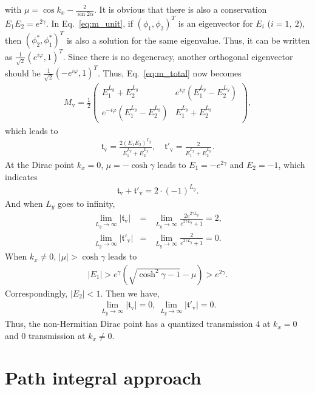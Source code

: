 \documentclass[aps,pra,reprint,superscriptaddress,showkeys,amsmath,amssymb,longbibliography]{revtex4-1}
\begin{document}
with $\mu=\cos k_x-\frac{2}{\sin 2\alpha}$. 
It is obvious that there is also a conservation $E_1E_2=e^{2\gamma}$.
In Eq.\ \eqref{eq:m_unit}, if $(\phi_1, \phi_2)^T$ is an eigenvector for $E_i$ ($i=1,~2$), then $(\phi_2^{*}, \phi_1^{*})^T$ is also a solution for the same eigenvalue. 
Thus, it can be written as $\frac{1}{\sqrt{2}}(e^{i\varphi},1)^T$.
Since there is no degeneracy, another orthogonal eigenvector should be $\frac{1}{\sqrt{2}}(-e^{i\varphi}, 1)^T$.
Thus, Eq.\ \eqref{eq:m_total} now becomes
\begin{eqnarray}
M_{\text{v}}=\frac{1}{2}\begin{pmatrix}
E_1^{L_y}+E_2^{L_y}&e^{i\varphi}(E_1^{L_y}-E_2^{L_y})\\
e^{-i\varphi}(E_1^{L_y}-E_2^{L_y})&E_1^{L_y}+E_2^{L_y}
\end{pmatrix},
\end{eqnarray}
which leads to
\begin{eqnarray}
\mathfrak{t}_{\text{v}}=\frac{2(E_1E_2)^{L_y}}{E_1^{L_y}+E_2^{L_y}},
  \quad
\mathfrak{t}'_{\text{v}}=\frac{2}{E_1^{L_y}+E_2^{L_y}}.\label{eq:t_and_tp}
\end{eqnarray}
At the Dirac point $k_x=0$, $\mu=-\cosh\gamma$ leads to $E_1=-e^{2\gamma}$ and $E_2=-1$, which indicates
\begin{eqnarray}
\mathfrak{t}_{\text{v}}+\mathfrak{t}'_{\text{v}}=2\cdot (-1)^{L_y}.
\end{eqnarray}
And when $L_y$ goes to infinity,
\begin{eqnarray}
\lim_{L_y\rightarrow\infty}|\mathfrak{t}_{\text{v}}|&=&\lim_{L_y\rightarrow\infty}\frac{2e^{2\gamma L_y}}{e^{2\gamma L_y}+1}=2,\\
\lim_{L_y\rightarrow\infty}|\mathfrak{t}'_{\text{v}}|&=&\lim_{L_y\rightarrow\infty}\frac{2}{e^{2\gamma L_y}+1}=0.
\end{eqnarray}
When $k_x\neq 0$, $|\mu|>\cosh\gamma$ leads to
\begin{eqnarray}
|E_1|>e^{\gamma}(\sqrt{\cosh^2\gamma-1}-\mu)>e^{2\gamma}.
\end{eqnarray}
Correspondingly, $|E_2|<1$.
Then we have,
\begin{eqnarray}
\lim_{L_y\rightarrow\infty}|\mathfrak{t}_{\text{v}}|=0,~
\lim_{L_y\rightarrow\infty}|\mathfrak{t}'_{\text{v}}|=0.
\end{eqnarray}
Thus, the non-Hermitian Dirac point has a quantized transmission $4$ at $k_x=0$ and  $0$ transmission at $k_x\neq 0$.

\section{Path integral approach}
\label{Path integral approach}
\end{document}
